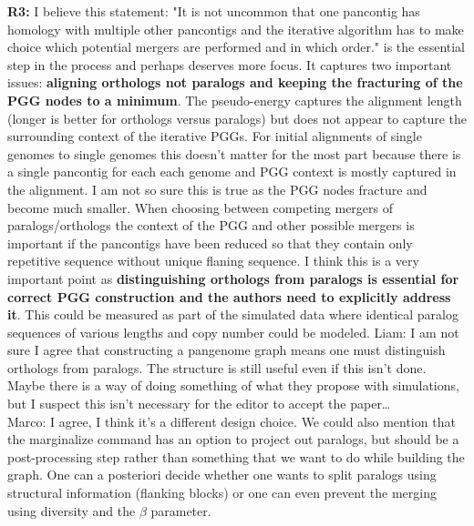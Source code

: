 \documentclass[aps,rmp,onecolumn]{revtex4-1}
\newcommand{\Marco}[1]{{\color{gray}Marco: #1}}
\newcommand{\Liam}[1]{{\color{teal}Liam: #1}}
\newcommand{\reviewer}[2]{\textbf{#1:} #2\vskip 5mm}
\begin{document}
\reviewer{R3}{I believe this statement: "It is not uncommon that one pancontig has homology with multiple other pancontigs and the iterative algorithm has to make choice which potential mergers are performed and in which order." is the essential step in the process and perhaps deserves more focus. It captures two important issues: \textbf{aligning orthologs not paralogs and keeping the fracturing of the PGG nodes to a minimum}. The pseudo-energy captures the alignment length (longer is better for orthologs versus paralogs) but does not appear to capture the surrounding context of the iterative PGGs. For initial alignments of single genomes to single genomes this doesn't matter for the most part because there is a single pancontig for each each genome and PGG context is mostly captured in the alignment. I am not so sure this is true as the PGG nodes fracture and become much smaller. When choosing between competing mergers of paralogs/orthologs the context of the PGG and other possible mergers is important if the pancontigs have been reduced so that they contain only repetitive sequence without unique flaning sequence. I think this is a very important point as \textbf{distinguishing orthologs from paralogs is essential for correct PGG construction and the authors need to explicitly address it}. This could be measured as part of the simulated data where identical paralog sequences of various lengths and copy number could be modeled.}
\Liam{I am not sure I agree that constructing a pangenome graph means one must distinguish orthologs from paralogs. The structure is still useful even if this isn't done. Maybe there is a way of doing something of what they propose with simulations, but I suspect this isn't necessary for the editor to accept the paper\ldots}\\
\Marco{I agree, I think it's a different design choice. We could also mention that the marginalize command has an option to project out paralogs, but should be a post-processing step rather than something that we want to do while building the graph. One can a posteriori decide whether one wants to split paralogs using structural information (flanking blocks) or one can even prevent the merging using diversity and the $\beta$ parameter.}
\end{document}

